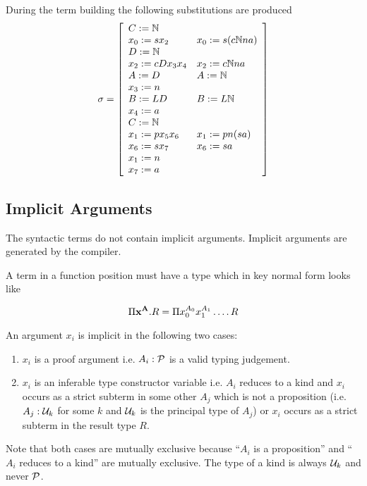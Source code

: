 During the term building the following substitutions are produced
$$
\sigma = \left[
\begin{array}{ll}
  C:={\mathbb{N}}
  \\ x_0:= s x_2      & x_0 := s (c {\mathbb{N}} n a)
  \\ D:={\mathbb{N}}
  \\ x_2:=c D x_3 x_4 & x_2 := c {\mathbb{N}} n a
  \\ A := D           & A := {\mathbb{N}}
  \\ x_3 := n
  \\ B := L D         & B := L {\mathbb{N}}
  \\ x_4 := a
  \\ C := {\mathbb{N}}
  \\ x_1 := p x_5 x_6 & x_1 := p n (s a)
  \\ x_6 := s x_7     & x_6 := s a
  \\ x_1 := n
  \\ x_7 := a
\end{array}
\right]
$$


%
\subsection{Implicit Arguments}

The syntactic terms do not contain implicit arguments. Implicit arguments are
generated by the compiler.

A term in a function position must have a type which in key normal form looks
like

$$
\Pi \mathbf{x}^{\mathbf{A}} . R = \Pi x_0^{A_0} x_1^{A_1} \ldots .\, R
$$

An argument $x_i$ is implicit in the following two cases:

\begin{enumerate}
\item $x_i$ is a proof argument i.e. $A_i : {\cal{P}}$ is a valid typing
  judgement.

\item $x_i$ is an inferable type constructor variable i.e. $A_i$ reduces to a
  kind and $x_i$ occurs as a strict subterm in some other $A_j$ which is not a
  proposition (i.e. $A_j:{\cal{U}}_k$ for some $k$ and ${\cal{U}}_k$ is the principal
  type of $A_j$) or $x_i$ occurs as a strict subterm in the result type $R$.
\end{enumerate}

Note that both cases are mutually exclusive because ``$A_i$ is a proposition''
and ``$A_i$ reduces to a kind'' are mutually exclusive. The type of a kind is
always ${\cal{U}}_k$ and never ${\cal{P}}$.

